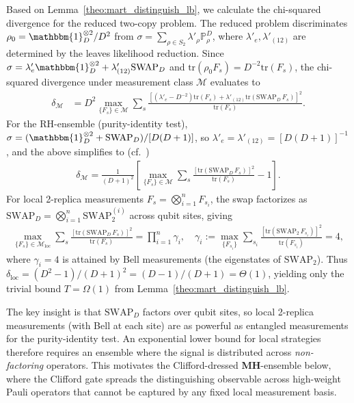 \documentclass[aps,%
twocolumn,%
floatfix,%
pra,%
amsfonts,%
groupedaddress,%
superscriptaddress]{revtex4-2}%
\newcommand{\1}{\mathbbm{1}}
\begin{document}
Based on Lemma~\ref{theo:mart_distinguish_lb}, we calculate the chi-squared divergence for the reduced two-copy problem.
\color{red}
The reduced problem discriminates $\rho_0 = \1_D^{\otimes 2}/D^2$ from $\sigma = \sum_{\rho \in S_2}\lambda'_\rho \mathbb{P}_\rho^D$, where $\lambda'_e, \lambda'_{(12)}$ are determined by the leaves likelihood reduction. Since $\sigma = \lambda'_e \1_D^{\otimes 2} + \lambda'_{(12)}\mathrm{SWAP}_D$ and $\mathrm{tr}(\rho_0 F_s) = D^{-2}\mathrm{tr}(F_s)$, the chi-squared divergence under measurement class $\mathcal{M}$ evaluates to
\begin{align}
    \delta_{\mathcal{M}} &= D^2 \max_{\{F_s\} \in \mathcal{M}} \sum_s \frac{[(\lambda'_e - D^{-2})\mathrm{tr}(F_s) + \lambda'_{(12)}\mathrm{tr}(\mathrm{SWAP}_D\, F_s)]^2}{\mathrm{tr}(F_s)}.
\end{align}
For the RH-ensemble (purity-identity test), $\sigma = (\1_D^{\otimes 2} + \mathrm{SWAP}_D)/[D(D+1)]$, so $\lambda'_e = \lambda'_{(12)} = [D(D+1)]^{-1}$, and the above simplifies to (cf.~\cite{chen2021exponential})
\begin{align}\label{eq:chi2_RH}
    \delta_{\mathcal{M}} = \frac{1}{(D+1)^2}\left[\max_{\{F_s\} \in \mathcal{M}} \sum_s \frac{[\mathrm{tr}(\mathrm{SWAP}_D\, F_s)]^2}{\mathrm{tr}(F_s)} - 1\right].
\end{align}
For local 2-replica measurements $F_s = \bigotimes_{i=1}^n F_{s_i}$, the swap factorizes as $\mathrm{SWAP}_D = \bigotimes_{i=1}^n \mathrm{SWAP}_2^{(i)}$ across qubit sites, giving
\begin{align}
    \max_{\{F_s\} \in \mathcal{M}_{\mathrm{loc}}} \sum_s \frac{[\mathrm{tr}(\mathrm{SWAP}_D\, F_s)]^2}{\mathrm{tr}(F_s)} = \prod_{i=1}^n \gamma_i, \quad \gamma_i := \max_{\{F_{s_i}\}} \sum_{s_i} \frac{[\mathrm{tr}(\mathrm{SWAP}_2\, F_{s_i})]^2}{\mathrm{tr}(F_{s_i})} = 4,
\end{align}
where $\gamma_i = 4$ is attained by Bell measurements (the eigenstates of $\mathrm{SWAP}_2$). Thus $\delta_{\mathrm{loc}} = (D^2 - 1)/(D+1)^2 = (D-1)/(D+1) = \Theta(1)$, yielding only the trivial bound $T = \Omega(1)$ from Lemma~\ref{theo:mart_distinguish_lb}.

The key insight is that $\mathrm{SWAP}_D$ factors over qubit sites, so local 2-replica measurements (with Bell at each site) are as powerful as entangled measurements for the purity-identity test. An exponential lower bound for local strategies therefore requires an ensemble where the signal is distributed across \emph{non-factoring} operators. This motivates the Clifford-dressed \textbf{MH}-ensemble below, where the Clifford gate spreads the distinguishing observable across high-weight Pauli operators that cannot be captured by any fixed local measurement basis.
\color{black}
\end{document}
